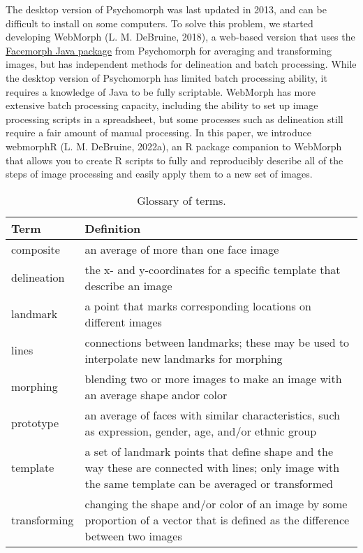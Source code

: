 \documentclass[
  doc,floatsintext]{apa6}
\begin{document}
The desktop version of Psychomorph was last updated in 2013, and can be difficult to install on some computers. To solve this problem, we started developing WebMorph (L. M. DeBruine, 2018), a web-based version that uses the \href{https://users.aber.ac.uk/bpt/jpsychomorph/version6/javadoc/}{Facemorph Java package} from Psychomorph for averaging and transforming images, but has independent methods for delineation and batch processing. While the desktop version of Psychomorph has limited batch processing ability, it requires a knowledge of Java to be fully scriptable. WebMorph has more extensive batch processing capacity, including the ability to set up image processing scripts in a spreadsheet, but some processes such as delineation still require a fair amount of manual processing. In this paper, we introduce webmorphR (L. M. DeBruine, 2022a), an R package companion to WebMorph that allows you to create R scripts to fully and reproducibly describe all of the steps of image processing and easily apply them to a new set of images.

\begin{table}

\caption{\label{tab:glossary}Glossary of terms.}
\centering
\begin{tabular}[t]{l|l}
\hline
Term & Definition\\
\hline
composite & an average of more than one face image\\
\hline
delineation & the x- and y-coordinates for a specific template that describe an image\\
\hline
landmark & a point that marks corresponding locations on different images\\
\hline
lines & connections between landmarks; these may be used to interpolate new landmarks for morphing\\
\hline
morphing & blending two or more images to make an image with an average shape andor color\\
\hline
prototype & an average of faces with similar characteristics, such as expression, gender, age, and/or ethnic group\\
\hline
template & a set of landmark points that define shape and the way these are connected with lines; only image with the same template can be averaged or transformed\\
\hline
transforming & changing the shape and/or color of an image by some proportion of a vector that is  defined as the difference between two images\\
\hline
\end{tabular}
\end{table}
\end{document}
